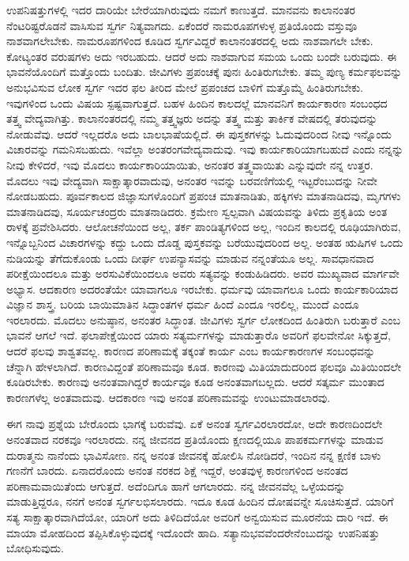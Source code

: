 ಉಪನಿಷತ್ತುಗಳಲ್ಲಿ ಇದರ ದಾರಿಯೇ ಬೇರೆಯಾಗಿರುವುದು ನಮಗೆ ಕಾಣುತ್ತದೆ. ಮಾನವನು ಕಾಲಾನಂತರ ನೆಂಟರಿಷ್ಟರೊಡನೆ ವಾಸಿಸುವ ಸ್ವರ್ಗ ನಿತ್ಯವಾಗದು. ಏಕೆಂದರೆ ನಾಮರೂಪಗಳುಳ್ಳ ಪ್ರತಿಯೊಂದು ವಸ್ತುವೂ ನಾಶವಾಗಲೇಬೇಕು. ನಾಮರೂಪಗಳಿಂದ ಕೂಡಿದ ಸ್ವರ್ಗವಿದ್ದರೆ ಕಾಲಾನಂತರದಲ್ಲಿ ಅದು ನಾಶವಾಗಲೇ ಬೇಕು. ಕೋಟ್ಯಂತರ ವರುಷಗಳು ಅದು ಇರಬಹುದು. ಆದರೆ ಅದು ನಾಶವಾಗುವ ಸಮಯ ಒಂದು ಬಂದೇ ಬರುವುದು. ಈ ಭಾವನೆಯೊಂದಿಗೆ ಮತ್ತೊಂದು ಬಂದಿತು. ಜೀವಿಗಳು ಪ್ರಪಂಚಕ್ಕೆ ಪುನಃ ಹಿಂತಿರುಗಬೇಕು. ತಮ್ಮ ಪುಣ್ಯ ಕರ್ಮಫಲವನ್ನು ಅನುಭವಿಸುವ ಲೋಕ ಸ್ವರ್ಗ ಇದರ ಫಲ ತೀರಿದ ಮೇಲೆ ಪ್ರಪಂಚದ ಬಾಳಿಗೆ ಮತ್ತೊಮ್ಮೆ ಹಿಂತಿರುಗಬೇಕು. ಇವುಗಳಿಂದ ಒಂದು ವಿಷಯ ಸ್ಪಷ್ಟವಾಗುತ್ತದೆ. ಬಹಳ ಹಿಂದಿನ ಕಾಲದಲ್ಲೆ ಮಾನವನಿಗೆ ಕಾರ್ಯಕಾರಣ ಸಂಬಂಧದ ತತ್ತ್ವ ವೇದ್ಯವಾಗಿತ್ತು. ಕಾಲಾನಂತರದಲ್ಲಿ ನಮ್ಮ ತತ್ತ್ವಜ್ಞರು ಅದನ್ನು ತತ್ತ್ವ ಮತ್ತು ತಾರ್ಕಿಕ ವೇಷದಲ್ಲಿ ತರುವುದನ್ನು ನೋಡುವೆವು. ಆದರೆ ಇಲ್ಲದರೊ ಅದು ಬಾಲಭಾಷೆಯಲ್ಲಿದೆ. ಈ ಪುಸ್ತಕಗಳನ್ನು ಓದುವುದರಿಂದ ನೀವು ಇನ್ನೊಂದು ವಿಚಾರವನ್ನು ಗಮನಿಸಬಹುದು. ಇವೆಲ್ಲಾ ಅಂತರಂಗವೇದ್ಯವಾದುವು. ಇವು ಕಾರ್ಯಕಾರಿಯಾಗಬಹುದೆ ಎಂದು ನನ್ನನ್ನು ನೀವು ಕೇಳಿದರೆ, ಇವು ಮೊದಲು ಕಾರ್ಯಕಾರಿಯಾಯಿತು, ಅನಂತರ ತತ್ತ್ವವಾಯಿತು ಎನ್ನುವುದೇ ನನ್ನ ಉತ್ತರ. ಮೊದಲು ಇವು ವೇದ್ಯವಾಗಿ ಸಾಕ್ಷಾತ್ಕಾರವಾದುವು, ಅನಂತರ ಇವನ್ನು ಬರವಣಿಗೆಯಲ್ಲಿ ಇಟ್ಟರೆಂಬುದನ್ನು ನೀವೇ ನೋಡಬಹುದು. ಪೂರ್ವಕಾಲದ ಜಿಜ್ಞಾಸುಗಳೊಂದಿಗೆ ಪ್ರಪಂಚ ಮಾತನಾಡಿತು, ಹಕ್ಕಿಗಳು ಮಾತನಾಡಿದವು, ಮೃಗಗಳು ಮಾತನಾಡಿದವು, ಸೂರ್ಯಚಂದ್ರರು ಮಾತನಾಡಿದರು. ಕ್ರಮೇಣ ಸ್ವಲ್ಪವಾಗಿ ವಿಷಯವನ್ನು ತಿಳಿದು ಪ್ರಕೃತಿಯ ಅಂತ ರಾಳಕ್ಕೆ ಪ್ರವೇಶಿಸಿದರು. ಆಲೋಚನೆಯಿಂದ ಅಲ್ಲ, ತರ್ಕ ಪಾಂಡಿತ್ಯಗಳಿಂದ ಅಲ್ಲ, ಇಂದಿನ ಕಾಲದಲ್ಲಿ ರೂಢಿಯಾಗಿರುವ, ಇನ್ನೊಬ್ಬನಿಂದ ವಿಚಾರಗಳನ್ನು ಕದ್ದು ಒಂದು ದೊಡ್ಡ ಪುಸ್ತಕವನ್ನು ಬರೆಯುವುದರಿಂದ ಅಲ್ಲ. ಅಂತಹ ಋಷಿಗಳ ಒಂದು ನುಡಿಯನ್ನು ತೆಗೆದುಕೊಂಡು ಒಂದು ದೀರ್ಘ ಉಪನ್ಯಾಸವನ್ನು ಮಾಡುವ ನನ್ನಂತೆಯೂ ಅಲ್ಲ. ಸಾವಧಾನವಾದ ಪರೀಕ್ಷೆಯಿಂದಲೂ ಮತ್ತು ಅರಸುವಿಕೆಯಿಂದಲೂ ಅವರು ಸತ್ಯವನ್ನು ಕಂಡುಹಿಡಿದರು. ಅವರ ಮುಖ್ಯವಾದ ಮಾರ್ಗವೇ ಅಭ್ಯಾಸ. ಆದಕಾರಣ ಅದರಂತೆಯೇ ಯಾವಾಗಲೂ ಇರಬೇಕು. ಧರ್ಮವು ಯಾವಾಗಲೂ ಒಂದು ಕಾರ್ಯಕಾರಿಯಾದ ವಿಜ್ಞಾನ ಶಾಸ್ತ್ರ. ಬರಿಯ ಬಾಯಿಮಾತಿನ ಸಿದ್ಧಾಂತಗಳ ಧರ್ಮ ಹಿಂದೆ ಎಂದೂ ಇರಲಿಲ್ಲ, ಮುಂದೆ ಎಂದೂ ಇರಲಾರದು. ಮೊದಲು ಅನುಷ್ಠಾನ, ಅನಂತರ ಸಿದ್ಧಾಂತ. ಜೀವಿಗಳು ಸ್ವರ್ಗ ಲೋಕದಿಂದ ಹಿಂತಿರುಗಿ ಬರುತ್ತಾರೆ ಎಂಬ ಭಾವನೆ ಆಗಲೆ ಇದೆ. ಫಲಾಪೇಕ್ಷೆಯಿಂದ ಯಾರು ಸತ್ಯರ್ಮಗಳನ್ನು ಮಾಡುತ್ತಾರೊ ಅವರಿಗೆ ಫಲವೇನೋ ಸಿಕ್ಕುತ್ತದೆ, ಆದರೆ ಫಲವು ಶಾಶ್ವತವಲ್ಲ. ಕಾರಣದ ಪರಿಣಾಮಕ್ಕೆ ತಕ್ಕಂತೆ ಕಾರ್ಯ ಎಂಬ ಕಾರ್ಯಕಾರಣಗಳ ಸಂಬಂಧವನ್ನು ಚೆನ್ನಾಗಿ ಹೇಳಲಾಗಿದೆ. ಕಾರಣವಿದ್ದಂತೆ ಪರಿಣಾಮವೂ ಕೂಡ. ಕಾರಣವು ಮಿತಿಯಾದುದರಿಂದ ಫಲವೂ ಮಿತಿಯಿಂದಲೇ ಕೂಡಿರಬೇಕು. ಕಾರಣವು ಅನಂತವಾಗಿದ್ದರೆ ಕಾರ್ಯವೂ ಕೂಡ ಅನಂತವಾಗಬಲ್ಲದು. ಆದರೆ ಸತ್ಕರ್ಮ ಮುಂತಾದ ಕಾರಣಗಳೆಲ್ಲ ಅಂತವಾದುವು. ಆದಕಾರಣ ಇವು ಅನಂತ ಪರಿಣಾಮವನ್ನು ಉಂಟುಮಾಡಲಾರವು. 

\vskip 6pt

ಈಗ ನಾವು ಪ್ರಶ್ನೆಯ ಬೇರೊಂದು ಭಾಗಕ್ಕೆ ಬರುವೆವು. ಏಕೆ ಅನಂತ ಸ್ವರ್ಗವಿರಲಾರದೋ, ಅದೇ ಕಾರಣದಿಂದಲೇ ಅನಂತವಾದ ನರಕವೂ ಇರಲಾರದು. ನನ್ನ ಜೀವನದ ಪ್ರತಿಯೊಂದು ಕ್ಷಣದಲ್ಲಿಯೂ ಪಾಪಕರ್ಮಗಳನ್ನು ಮಾಡುವ ದುರಾತ್ಮನು ನಾನೆಂದು ಭಾವಿಸೋಣ. ನನ್ನ ಅನಂತ ಜೀವನಕ್ಕೆ ಹೋಲಿಸಿ ನೋಡಿದರೆ, ಇಂದಿನ ನನ್ನ ಕ್ಷಣಿಕ ಬಾಳು ಗಣನೆಗೆ ಬಾರದು. ಏನಾದರೊಂದು ಅನಂತ ನರಕದ ಶಿಕ್ಷೆ ಇದ್ದರೆ, ಅಂತವುಳ್ಳ ಕಾರಣಗಳಿಂದ ಅನಂತದ ಪರಿಣಾಮವಾಯಿತೆಂದು ಆಗುತ್ತದೆ. ಅದೆಂದಿಗೂ ಹಾಗೆ ಆಗಲಾರದು. ನನ್ನ ಜೀವನವೆಲ್ಲ ಒಳ್ಳೆಯದನ್ನು ಮಾಡುತ್ತಿದ್ದರೂ, ನನಗೆ ಅನಂತ ಸ್ವರ್ಗಲಭಿಸಲಾರದು. ಇದೂ ಕೂಡ ಹಿಂದಿನ ದೋಷವನ್ನೇ ಸೂಚಿಸುತ್ತದೆ. ಯಾರಿಗೆ ಸತ್ಯ ಸಾಕ್ಷಾತ್ಕಾರವಾಗಿದೆಯೋ, ಯಾರಿಗೆ ಅದು ತಿಳಿದಿದೆಯೋ ಅವರಿಗೆ ಅನ್ವಯಿಸುವ ಮೂರನೆಯ ದಾರಿ ಇದೆ. ಈ ಮಾಯಾ ಮೋಹದಿಂದ ತಪ್ಪಿಸಿಕೊಳ್ಳುವುದಕ್ಕೆ ಇದೊಂದೇ ಹಾದಿ. ಸತ್ಯಾನುಭವವೆಂದರೇನೆಂಬುದನ್ನು ಉಪನಿಷತ್ತು ಬೋಧಿಸುವುದು. 

